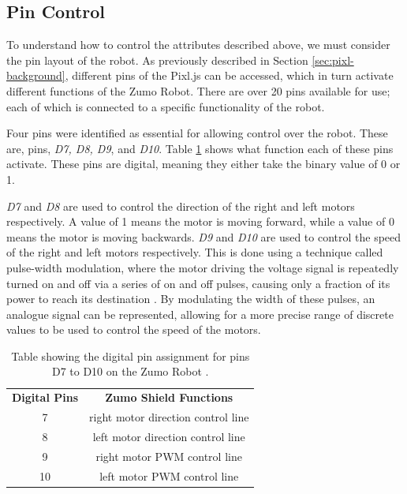 \documentclass{l4proj}
\begin{document}
\subsection{Pin Control}\label{sec:pin-control}
To understand how to control the attributes described above, we must consider the pin layout of the robot. As previously described in Section \ref{sec:pixl-background}, different pins of the Pixl.js can be accessed, which in turn activate different functions of the Zumo Robot. There are over 20 pins available for use; each of which is connected to a specific functionality of the robot.

Four pins were identified as essential for allowing control over the robot. These are, pins, \textit{D7, D8, D9}, and \textit{D10}. Table \ref{tab:pin-assignment-zumo} shows what function each of these pins activate. These pins are digital, meaning they either take the binary value of 0 or 1.

\textit{D7} and \textit{D8} are used to control the direction of the right and left motors respectively. A value of 1 means the motor is moving forward, while a value of 0 means the motor is moving backwards. \textit{D9} and \textit{D10} are used to control the speed of the right and left motors respectively. This is done using a technique called pulse-width modulation, where the motor driving the voltage signal is repeatedly turned on and off via a series of on and off pulses, causing only a fraction of its power to reach its destination \citep{kart2001pulse}. By modulating the width of these pulses, an analogue signal can be represented, allowing for a more precise range of discrete values to be used to control the speed of the motors.

\begin{table}[!h]
    \centering
    \caption{Table showing the digital pin assignment for pins D7 to D10 on the Zumo Robot \citep{zumopinassignment}.}
    \label{tab:pin-assignment-zumo}
    \begin{tabular}{cc}
        \textbf{Digital Pins} & \textbf{Zumo Shield Functions} \\
        7 & right motor direction control line \\
        8 & left motor direction control line \\
        9 & right motor PWM control line \\ 
        10 & left motor PWM control line
    \end{tabular}
\end{table}
\end{document}
